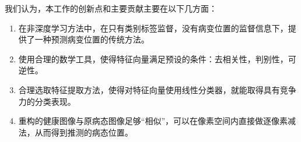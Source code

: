     我们认为，本工作的创新点和主要贡献主要在以下几方面：
    \begin{enumerate}
        \item 在非深度学习方法中，在只有类别标签监督，没有病变位置的监督信息下，提供了一种预测病变位置的传统方法。
        \item 使用合理的数学工具，使得特征向量满足预设的条件：去相关性，判别性，可逆性。
        \item 合理选取特征提取方法，使得对特征向量使用线性分类器，就能取得具有竞争力的分类表现。
        \item 重构的健康图像与原病态图像足够“相似”，可以在像素空间内直接做逐像素减法，从而得到推测的病态位置。
    \end{enumerate}





